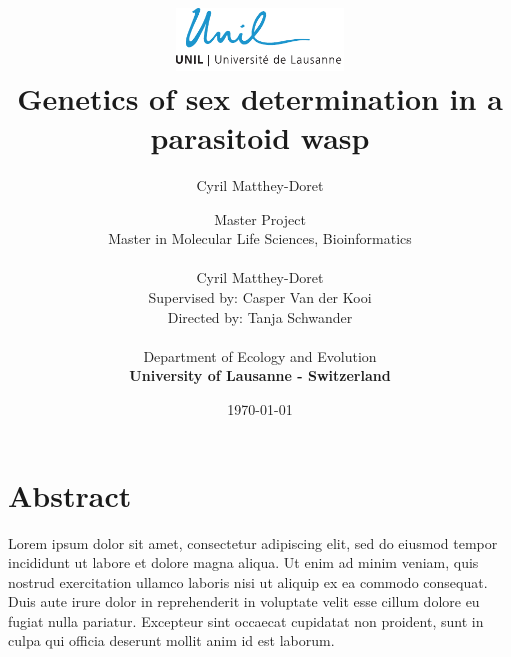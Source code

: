 \documentclass[11pt,a4paper]{report}
\author{Cyril Matthey-Doret}
\title{
\includegraphics[width=1.75in]{lo_unil06_bleu.pdf} \\
\vspace*{1in}
\textbf{Genetics of sex determination in a parasitoid wasp}}
\author{\Large{Master Project}\\
		Master in Molecular Life Sciences, Bioinformatics\\
				\vspace*{0.5in} \\
		Cyril Matthey-Doret\\
        Supervised by: Casper Van der Kooi\\
        Directed by: Tanja Schwander\\
		\vspace*{0.5in} \\
		Department of Ecology and Evolution\\
        \textbf{University of Lausanne - Switzerland}\\
       } \date{\today}
\begin{document}
\renewcommand{\headrulewidth}{1pt}
\maketitle

\section*{Abstract}
Lorem ipsum dolor sit amet, consectetur adipiscing elit, sed do eiusmod tempor incididunt ut labore et dolore magna aliqua. Ut enim ad minim veniam, quis nostrud exercitation ullamco laboris nisi ut aliquip ex ea commodo consequat. Duis aute irure dolor in reprehenderit in voluptate velit esse cillum dolore eu fugiat nulla pariatur. Excepteur sint occaecat cupidatat non proident, sunt in culpa qui officia deserunt mollit anim id est laborum.
\end{document}

